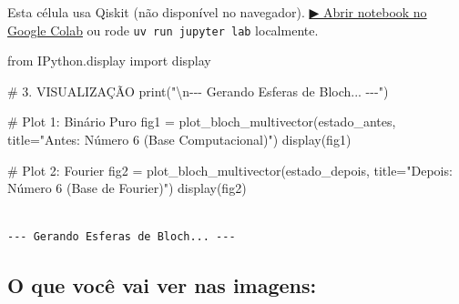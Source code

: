\documentclass[
  brazilian,
]{report}
\newenvironment{Shaded}{\begin{snugshade}}{\end{snugshade}}
\newcommand{\BuiltInTok}[1]{\textcolor[rgb]{0.00,0.23,0.31}{#1}}
\newcommand{\CharTok}[1]{\textcolor[rgb]{0.13,0.47,0.30}{#1}}
\newcommand{\CommentTok}[1]{\textcolor[rgb]{0.37,0.37,0.37}{#1}}
\newcommand{\ImportTok}[1]{\textcolor[rgb]{0.00,0.46,0.62}{#1}}
\newcommand{\NormalTok}[1]{\textcolor[rgb]{0.00,0.23,0.31}{#1}}
\newcommand{\OperatorTok}[1]{\textcolor[rgb]{0.37,0.37,0.37}{#1}}
\newcommand{\StringTok}[1]{\textcolor[rgb]{0.13,0.47,0.30}{#1}}
\begin{document}
\begin{tcolorbox}[enhanced jigsaw, arc=.35mm, bottomrule=.15mm, bottomtitle=1mm, breakable, colback=white, colbacktitle=quarto-callout-warning-color!10!white, colframe=quarto-callout-warning-color-frame, coltitle=black, left=2mm, leftrule=.75mm, opacityback=0, opacitybacktitle=0.6, rightrule=.15mm, title=\textcolor{quarto-callout-warning-color}{\faExclamationTriangle}\hspace{0.5em}{⚛️ Célula Qiskit --- execute no Colab ou localmente}, titlerule=0mm, toprule=.15mm, toptitle=1mm]

Esta célula usa Qiskit (não disponível no navegador).
\href{https://colab.research.google.com/github/maxwellamaral/aula-quantum/blob/main/notebooks/07-quantum-fourier-transform.ipynb}{▶
Abrir notebook no Google Colab} ou rode \texttt{uv\ run\ jupyter\ lab}
localmente.

\begin{Shaded}
\begin{Highlighting}[]

\ImportTok{from}\NormalTok{ IPython.display }\ImportTok{import}\NormalTok{ display}

\CommentTok{\# 3. VISUALIZAÇÃO}
\BuiltInTok{print}\NormalTok{(}\StringTok{"}\CharTok{\textbackslash{}n}\StringTok{{-}{-}{-} Gerando Esferas de Bloch... {-}{-}{-}"}\NormalTok{)}

\CommentTok{\# Plot 1: Binário Puro}
\NormalTok{fig1 }\OperatorTok{=}\NormalTok{ plot\_bloch\_multivector(estado\_antes, title}\OperatorTok{=}\StringTok{"Antes: Número 6 (Base Computacional)"}\NormalTok{)}
\NormalTok{display(fig1)}

\CommentTok{\# Plot 2: Fourier}
\NormalTok{fig2 }\OperatorTok{=}\NormalTok{ plot\_bloch\_multivector(estado\_depois, title}\OperatorTok{=}\StringTok{"Depois: Número 6 (Base de Fourier)"}\NormalTok{)}
\NormalTok{display(fig2)}
\end{Highlighting}
\end{Shaded}

\end{tcolorbox}

\begin{verbatim}

--- Gerando Esferas de Bloch... ---
\end{verbatim}

\subsection{O que você vai ver nas
imagens:}\label{o-que-vocuxea-vai-ver-nas-imagens}
\end{document}
